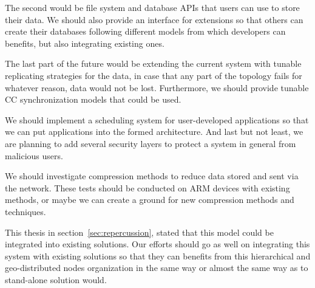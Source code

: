 \noindent
The second would be file system and database APIs that users can use to store their data. We should also provide an interface for extensions so that others can create their databases following different models from which developers can benefits, but also integrating existing ones.

The last part of the future would be extending the current system with tunable replicating strategies for the data, in case that any part of the topology fails for whatever reason, data would not be lost. Furthermore, we should provide tunable CC synchronization models that could be used.

We should implement a scheduling system for user-developed applications so that we can put applications into the formed architecture. And last but not least, we are planning to add several security layers to protect a system in general from malicious users.

We should investigate compression methods to reduce data stored and sent via the network. These tests should be conducted on ARM devices with existing methods, or maybe we can create a ground for new compression methods and techniques.

This thesis in section~\ref{sec:repercussion}, stated that this model could be integrated into existing solutions. Our efforts should go as well on integrating this system with existing solutions so that they can benefits from this hierarchical and geo-distributed nodes organization in the same way or almost the same way as to stand-alone solution would.
%
%